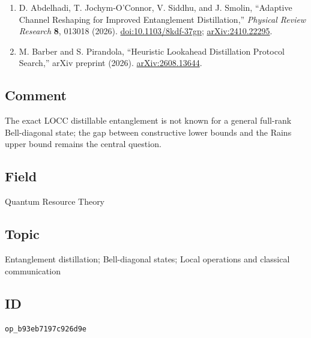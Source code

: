 \begin{enumerate}[label={},leftmargin=4.8em,labelsep=0.5em]
  \item[\textup{[AJSS26]}]\label{ref:p3-abdelhadi}
  D. Abdelhadi, T. Jochym-O'Connor, V. Siddhu, and J. Smolin, ``Adaptive
  Channel Reshaping for Improved Entanglement Distillation,''
  \emph{Physical Review Research} \textbf{8}, 013018 (2026).
  \href{https://doi.org/10.1103/8kdf-37gp}{doi:10.1103/8kdf-37gp};
  \href{https://arxiv.org/abs/2410.22295}{arXiv:2410.22295}.

  \item[\textup{[BP26]}]\label{ref:p3-barber-pirandola}
  M. Barber and S. Pirandola,
  ``Heuristic Lookahead Distillation Protocol Search,'' arXiv preprint (2026).
  \href{https://arxiv.org/abs/2608.13644}{arXiv:2608.13644}.
\end{enumerate}

\subsection*{Comment}

The exact LOCC distillable entanglement is not known for a general full-rank
Bell-diagonal state; the gap between constructive lower bounds and the Rains
upper bound remains the central question.

\subsection*{Field}

Quantum Resource Theory

\subsection*{Topic}

Entanglement distillation; Bell-diagonal states; Local operations and classical communication

\subsection*{ID}

\texttt{op\_b93eb7197c926d9e}

